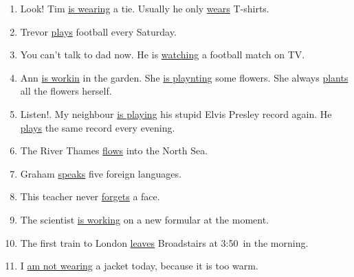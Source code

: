 \documentclass[a4paper,11pt]{scrartcl}%
\begin{document}
		\begin{enumerate}
			\item Look! Tim \underline{is wearing} a tie. Usually he only \underline{wears} T-shirts.
			\item Trevor \underline{plays} football every Saturday.
			\item You can't talk to dad now. He is \underline{watching} a football match on TV.
			\item Ann \underline{is workin} in the garden. She \underline{is playnting} some flowers. She
				always \underline{plants} all the flowers herself.
			\item Listen!. My neighbour \underline{is playing} his stupid Elvis Presley record again.
				He \underline{plays} the same record every evening.
			\item The River Thames \underline{flows} into the North Sea.
			\item Graham \underline{speaks} five foreign languages.
			\item This teacher never \underline{forgets} a face.
			\item The scientist \underline{is working} on a new formular at the moment.
			\item The first train to London \underline{leaves} Broadstairs at 3:50\ in the morning.
			\item I \underline{ am not wearing} a jacket today, because it is too warm.
		\end{enumerate}
\end{document}
